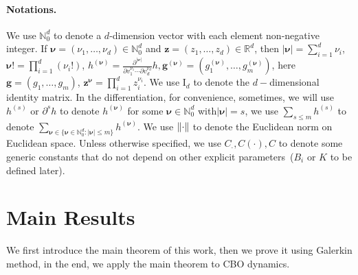 \documentclass[a4paper, 11pt]{article}
\theoremstyle{plain}
\theoremstyle{remark}
\theoremstyle{definition}
\begin{document}
\paragraph{Notations.} We use $\mathbb{N}_0^d$ to denote a $d$-dimension vector with each element non-negative integer.  If $\boldsymbol{\nu}=\left(\nu_1, \ldots, \nu_d\right) \in \mathbb{N}_0^d$ and
$\mathbf{z}=\left(z_1, \ldots, z_d\right) \in \mathbb{R}^d$,
then $|\boldsymbol{\nu}|  =\sum_{i=1}^d \nu_i$, $\boldsymbol{\nu}! =\prod_{i=1}^d\left(\nu_{i}!\right)$, $h^{(\boldsymbol{\nu})}=\frac{\partial^{|\boldsymbol{\nu}|}}{\partial v_1^{\nu_1} \cdots \partial v_d^{\nu_d}} h, \boldsymbol{g}^{(\boldsymbol{\nu})}=\left(g_1^{(\boldsymbol{\nu})},\ldots,g_m^{(\boldsymbol{\nu})}\right)$, here $\boldsymbol{g}=(g_1,\ldots,g_m)$, $\mathbf{z}^{\boldsymbol{\nu}} =\prod_{i=1}^d z_i^{\nu_i}$. We use $\mathrm{I}_d$ to denote the $d-$dimensional identity matrix. In the differentiation, for convenience, sometimes, we will use $h^{(s)}$ or $\partial^{s}h$ to denote $h^{(\boldsymbol{\nu})}$ for some $\boldsymbol{\nu}\in\mathbb{N}_0^d$ with$|\boldsymbol{\nu}|=s$, we use $\sum_{s\leq m}h^{(s)}$ to denote $\sum_{\boldsymbol{\nu}\in \{\boldsymbol{\nu}\in\mathbb{N}_0^d:|\boldsymbol{\nu}|\leq m\}}h^{(\boldsymbol{\nu})}$. We use $\norm{\cdot}$ to denote the Euclidean norm on Euclidean space. Unless otherwise specified, we use $C_{\cdot},C(\cdot),C$ to denote some generic constants that do not depend on other explicit parameters~($B_i$ or $K$ to be defined later).




		
		\section{Main Results}
        We first introduce the main theorem of this work, then we prove it using Galerkin method, in the end, we apply the main theorem to CBO dynamics.
\end{document}
